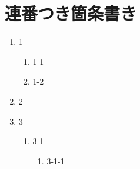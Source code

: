 \section*{連番つき箇条書き}\hypertarget{連番つき箇条書き}{}\label{連番つき箇条書き}

\begin{enumerate}
\item{} 1


\begin{enumerate}
\item{} 1-1
\item{} 1-2
\end{enumerate}
\item{} 2
\item{} 3


\begin{enumerate}
\item{} 3-1


\begin{enumerate}
\item{} 3-1-1
\end{enumerate}
\end{enumerate}
\end{enumerate}


